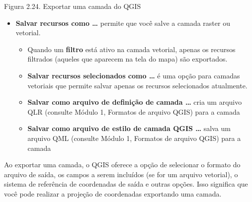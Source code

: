 \documentclass[
]{krantz}
\begin{document}
Figura 2.24. Exportar uma camada do QGIS

\begin{itemize}
\item
  \textbf{Salvar recursos como \ldots{}} permite que você salve a camada raster ou vetorial.

  \begin{itemize}
  \item
    Quando um \textbf{filtro} está ativo na camada vetorial, apenas os recursos filtrados (aqueles que aparecem na tela do mapa) são exportados.
  \item
    \textbf{Salvar recursos selecionados como \ldots{}} é uma opção para camadas vetoriais que permite salvar apenas os recursos selecionados atualmente.
  \item
    \textbf{Salvar como arquivo de definição de camada \ldots{}} cria um arquivo QLR (consulte Módulo 1, Formatos de arquivo QGIS) para a camada
  \item
    \textbf{Salvar como arquivo de estilo de camada QGIS \ldots{}} salva um arquivo QML (consulte Módulo 1, Formatos de arquivo QGIS) para a camada
  \end{itemize}
\end{itemize}

Ao exportar uma camada, o QGIS oferece a opção de selecionar o formato do arquivo de saída, os campos a serem incluídos (se for um arquivo vetorial), o sistema de referência de coordenadas de saída e outras opções. Isso significa que você pode realizar a projeção de coordenadas exportando uma camada.
\end{document}
